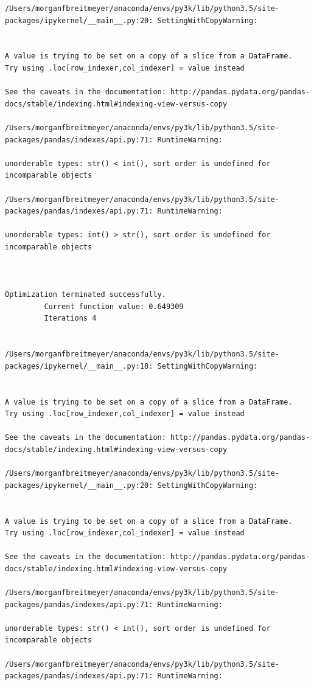 \begin{lstlisting}
/Users/morganfbreitmeyer/anaconda/envs/py3k/lib/python3.5/site-packages/ipykernel/__main__.py:20: SettingWithCopyWarning:


A value is trying to be set on a copy of a slice from a DataFrame.
Try using .loc[row_indexer,col_indexer] = value instead

See the caveats in the documentation: http://pandas.pydata.org/pandas-docs/stable/indexing.html#indexing-view-versus-copy

/Users/morganfbreitmeyer/anaconda/envs/py3k/lib/python3.5/site-packages/pandas/indexes/api.py:71: RuntimeWarning:

unorderable types: str() < int(), sort order is undefined for incomparable objects

/Users/morganfbreitmeyer/anaconda/envs/py3k/lib/python3.5/site-packages/pandas/indexes/api.py:71: RuntimeWarning:

unorderable types: int() > str(), sort order is undefined for incomparable objects



Optimization terminated successfully.
         Current function value: 0.649309
         Iterations 4


/Users/morganfbreitmeyer/anaconda/envs/py3k/lib/python3.5/site-packages/ipykernel/__main__.py:18: SettingWithCopyWarning:


A value is trying to be set on a copy of a slice from a DataFrame.
Try using .loc[row_indexer,col_indexer] = value instead

See the caveats in the documentation: http://pandas.pydata.org/pandas-docs/stable/indexing.html#indexing-view-versus-copy

/Users/morganfbreitmeyer/anaconda/envs/py3k/lib/python3.5/site-packages/ipykernel/__main__.py:20: SettingWithCopyWarning:


A value is trying to be set on a copy of a slice from a DataFrame.
Try using .loc[row_indexer,col_indexer] = value instead

See the caveats in the documentation: http://pandas.pydata.org/pandas-docs/stable/indexing.html#indexing-view-versus-copy

/Users/morganfbreitmeyer/anaconda/envs/py3k/lib/python3.5/site-packages/pandas/indexes/api.py:71: RuntimeWarning:

unorderable types: str() < int(), sort order is undefined for incomparable objects

/Users/morganfbreitmeyer/anaconda/envs/py3k/lib/python3.5/site-packages/pandas/indexes/api.py:71: RuntimeWarning:


\end{lstlisting}
